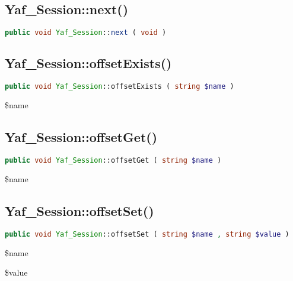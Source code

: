 \subsection{Yaf\_Session::next()}


\begin{lstlisting}[language=PHP]
public void Yaf_Session::next ( void )
\end{lstlisting}



\subsection{Yaf\_Session::offsetExists()}




\begin{lstlisting}[language=PHP]
public void Yaf_Session::offsetExists ( string $name )
\end{lstlisting}

\begin{compactitem}
\item \$name
\end{compactitem}

\subsection{Yaf\_Session::offsetGet()}


\begin{lstlisting}[language=PHP]
public void Yaf_Session::offsetGet ( string $name )
\end{lstlisting}


\begin{compactitem}
\item \$name
\end{compactitem}

\subsection{Yaf\_Session::offsetSet()}


\begin{lstlisting}[language=PHP]
public void Yaf_Session::offsetSet ( string $name , string $value )
\end{lstlisting}

\begin{compactitem}
\item \$name
\item \$value
\end{compactitem}


